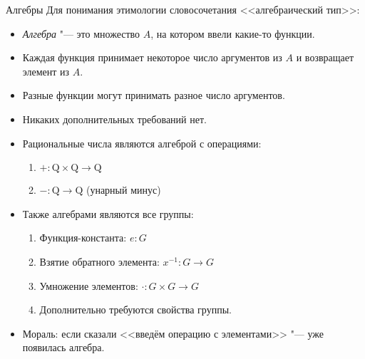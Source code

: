 \begin{frame}{Алгебры}
	Для понимания этимологии словосочетания <<алгебраический тип>>:
	\begin{itemize}
		\item \textit{Алгебра} "--- это множество $A$, на котором ввели какие-то функции.
		\item Каждая функция принимает некоторое число аргументов из $A$ и возвращает элемент из $A$.
		\item Разные функции могут принимать разное число аргументов.
		\item Никаких дополнительных требований нет.
		\item Рациональные числа являются алгеброй с операциями:
			\begin{enumerate}
				\item $+ \colon \mathrm{Q} \times \mathrm{Q} \to \mathrm{Q}$
				\item $- \colon \mathrm{Q} \to \mathrm{Q}$ (унарный минус)
			\end{enumerate}
		\item Также алгебрами являются все группы:
			\begin{enumerate}
				\item Функция-константа: $e \colon G$
				\item Взятие обратного элемента: $x^{-1} \colon G \to G$
				\item Умножение элементов: $\cdot \colon G \times G \to G$
				\item Дополнительно требуются свойства группы.
			\end{enumerate}
		\item Мораль: если сказали <<введём операцию с элементами>> "--- уже появилась алгебра.
	\end{itemize}
\end{frame}

